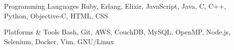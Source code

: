 

\begin{cvskills}

  \cvskill
    {Programming Languages} %
    {Ruby, Erlang, Elixir, JavaScript, Java, C, C++, Python, Objective-C, HTML, CSS} %

  \cvskill
  {Platforms \& Tools} %
    {Bash, Git, AWS, CouchDB, MySQL, OpenMP, Node.js, Selenium, Docker, Vim, GNU/Linux} %

\end{cvskills}
